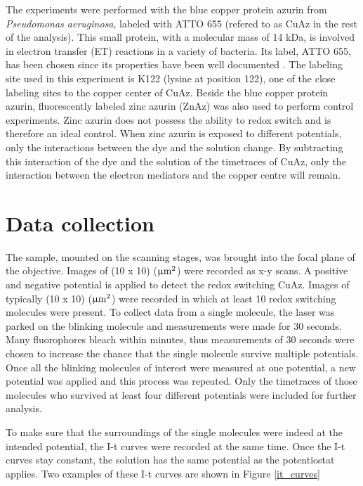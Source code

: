 \documentclass[twoside,single]{lion-msc}
\begin{document}
The experiments were performed with the blue copper protein azurin from \textit{Pseudomonas aeruginosa}, labeled with ATTO 655 (refered to as CuAz in the rest of the analysis). This small protein, with a molecular mass of 14 kDa, is involved in electron transfer (ET) reactions in a variety of bacteria. Its label, ATTO 655, has been chosen since its properties have been well documented \cite{pvd_11}. The labeling site used in this experiment is K122 (lysine at position 122), one of the close labeling sites to the copper center of CuAz.
Beside the blue copper protein azurin, fluorescently labeled zinc azurin (ZnAz) was also used to perform control experiments. Zinc azurin does not possess the ability to redox switch and is therefore an ideal control. When zinc azurin is exposed to different potentials, only the interactions between the dye and the solution change. By subtracting this interaction of the dye and the solution of the timetraces of CuAz, only the interaction between the electron mediators and the copper centre will remain. 

\section*{Data collection} \label{data_coll}
The sample, mounted on the scanning stages, was brought into the focal plane of the objective. Images of (10 x 10) ($\upmu \textup{m}^{2}$) were recorded as x-y scans. A positive and negative potential is applied to detect the redox switching CuAz. Images of typically (10 x 10) ($\upmu \textup{m}^{2}$) were recorded in which at least 10 redox switching molecules were present. To collect data from a single molecule, the laser was parked on the blinking molecule and measurements were made for 30 seconds.  Many fluorophores bleach within minutes, thus measurements of 30 seconds were chosen to increase the chance that the single molecule survive multiple potentials. Once all the blinking molecules of interest were measured at one potential, a new potential was applied and this process was repeated. Only the timetraces of those molecules who survived at least four different potentials were included for further analysis. 

To make sure that the surroundings of the single molecules were indeed at the intended potential, the I-t curves were recorded at the same time. Once the I-t curves stay constant, the solution has the same potential as the potentiostat applies. Two examples of these I-t curves are shown in Figure \ref{it_curves}
\end{document}
